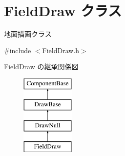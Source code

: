 \hypertarget{class_field_draw}{}\section{Field\+Draw クラス}
\label{class_field_draw}


地面描画クラス  




{\ttfamily \#include $<$Field\+Draw.\+h$>$}

Field\+Draw の継承関係図\begin{figure}[H]
\begin{center}
\leavevmode
\includegraphics[height=4.000000cm]{class_field_draw}
\end{center}
\end{figure}
